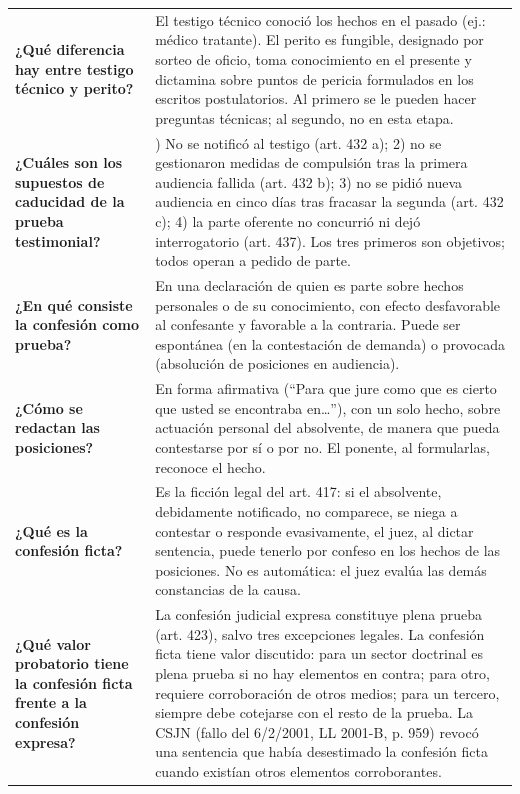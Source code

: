 \documentclass[12pt,oneside]{book}
\begin{document}
\begin{longtable}{
    >{\raggedright\arraybackslash}p{}
    >{\raggedright\arraybackslash}p{}
}
\textbf{¿Qué diferencia hay entre testigo técnico y perito?} &
El testigo técnico conoció los hechos en el pasado (ej.: médico tratante). El perito es fungible, designado por sorteo de oficio, toma conocimiento en el presente y dictamina sobre puntos de pericia formulados en los escritos postulatorios. Al primero se le pueden hacer preguntas técnicas; al segundo, no en esta etapa. \\

\textbf{¿Cuáles son los supuestos de caducidad de la prueba testimonial?} &
1) No se notificó al testigo (art. 432 a); 2) no se gestionaron medidas de compulsión tras la primera audiencia fallida (art. 432 b); 3) no se pidió nueva audiencia en cinco días tras fracasar la segunda (art. 432 c); 4) la parte oferente no concurrió ni dejó interrogatorio (art. 437). Los tres primeros son objetivos; todos operan a pedido de parte. \\

\textbf{¿En qué consiste la confesión como prueba?} &
En una declaración de quien es parte sobre hechos personales o de su conocimiento, con efecto desfavorable al confesante y favorable a la contraria. Puede ser espontánea (en la contestación de demanda) o provocada (absolución de posiciones en audiencia). \\

\textbf{¿Cómo se redactan las posiciones?} &
En forma afirmativa (``Para que jure como que es cierto que usted se encontraba en\ldots''), con un solo hecho, sobre actuación personal del absolvente, de manera que pueda contestarse por sí o por no. El ponente, al formularlas, reconoce el hecho. \\

\textbf{¿Qué es la confesión ficta?} &
Es la ficción legal del art. 417: si el absolvente, debidamente notificado, no comparece, se niega a contestar o responde evasivamente, el juez, al dictar sentencia, puede tenerlo por confeso en los hechos de las posiciones. No es automática: el juez evalúa las demás constancias de la causa. \\

\textbf{¿Qué valor probatorio tiene la confesión ficta frente a la confesión expresa?} &
La confesión judicial expresa constituye plena prueba (art. 423), salvo tres excepciones legales. La confesión ficta tiene valor discutido: para un sector doctrinal es plena prueba si no hay elementos en contra; para otro, requiere corroboración de otros medios; para un tercero, siempre debe cotejarse con el resto de la prueba. La CSJN (fallo del 6/2/2001, LL 2001-B, p. 959) revocó una sentencia que había desestimado la confesión ficta cuando existían otros elementos corroborantes. \\


\end{longtable}
\end{document}
